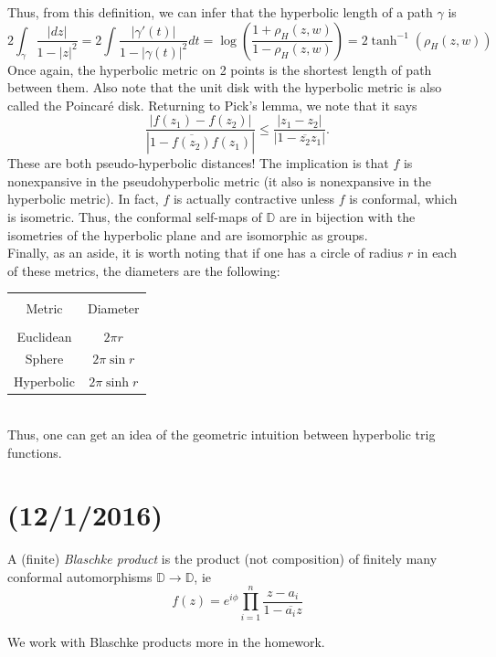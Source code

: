 \documentclass[11pt,leqno,oneside]{amsart}
\numberwithin{thm}{section}
\newcommand{\D}{\mathbb{D}}
\begin{document}
  Thus, from this definition, we can infer that the hyperbolic length
  of a path $\gamma$ is \[
    2\int_\gamma \frac{|dz|}{1-|z|^2} = 2 \int
    \frac{|\gamma'(t)|}{1-|\gamma(t)|^2}dt = \log \left(
      \frac{1+\rho_H(z,w)}{1-\rho_H(z,w)} \right) = 2 \tanh^{-1}(\rho_H(z,w))
  \]
  Once again, the hyperbolic metric on 2 points is the shortest length
  of path between them. Also note that the unit disk with the
  hyperbolic metric is also called the Poincar\'{e} disk. Returning to
  Pick's lemma, we note that it says \[
    \frac{|f(z_1)-f(z_2)|}{|1-\overline{f(z_2)}f(z_1)|} \leq \frac{|z_1-z_2|}{|1-\overline{z_2}z_1|}.
  \]
  These are both pseudo-hyperbolic distances! The implication is that
  $f$ is nonexpansive in the pseudohyperbolic metric (it also is
  nonexpansive in the hyperbolic metric). In fact, $f$ is actually
  contractive unless $f$ is conformal, which is isometric. Thus, the
  conformal self-maps of $\D$ are in bijection with the isometries of
  the hyperbolic plane and are isomorphic as groups. \\

  Finally, as an aside, it is worth noting that if one has a circle of
  radius $r$ in each of these metrics, the diameters are the
  following: \\
  \begin{tabular}{|c|c|}
    \hline &\\
    Metric & Diameter \\
    \hline &\\
    Euclidean & $2 \pi r$ \\
    Sphere & $2 \pi \sin r$ \\
    Hyperbolic & $2 \pi \sinh r$ \\
    \hline
  \end{tabular} \\
  Thus, one can get an idea of the geometric intuition between
  hyperbolic trig functions.
  \section{(12/1/2016)}
  \begin{defn}
    A (finite) \emph{Blaschke product} is the product (not
    composition) of finitely many conformal automorphisms $\D \to
    \D$, ie \[
      f(z) = e^{i\phi} \prod_{i=1}^n \frac{z-a_i}{1-\overline{a_i}z}
    \]
  \end{defn}
  We work with Blaschke products more in the homework. \\
\end{document}

